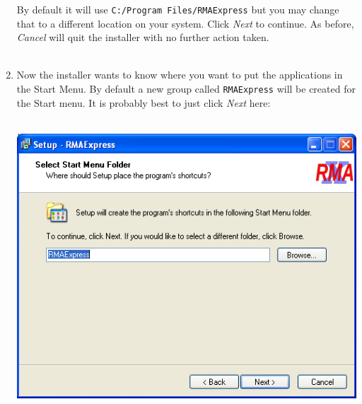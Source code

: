 \documentclass[11pt]{report}
\begin{document}
\begin{enumerate}
\begin{center}
\end{center}
By default it will use {\tt C:/Program Files/RMAExpress} but you may change that to a different location on your system. Click {\it Next} to continue. As before,  {\it Cancel} will quit the installer with no further action taken. \\ \\
\item Now the installer wants to know where you want to put the applications in the Start Menu. By default a new group called {\tt RMAExpress} will be created for the Start menu. It is probably best to just click {\it Next} here: \\ \\ 
\begin{center}
\includegraphics[scale=0.5]{Setup3}
\end{center}


\end{enumerate}
\end{document}
